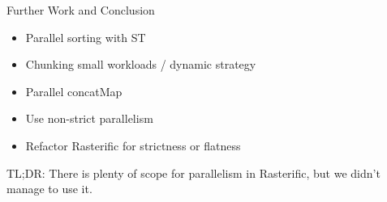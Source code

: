 \documentclass[slidestop,compress,mathserif, xcolor=table]{beamer}
\begin{document}
\begin{frame}[c]{Further Work and Conclusion}

\begin{itemize}
\item Parallel sorting with ST
\item Chunking small workloads / dynamic strategy
\item Parallel concatMap
\item Use non-strict parallelism
\item Refactor Rasterific for strictness or flatness
\end{itemize}

\bigskip

TL;DR: There is plenty of scope for parallelism in Rasterific, but we didn't manage to use it.

\end{frame}
\end{document}
